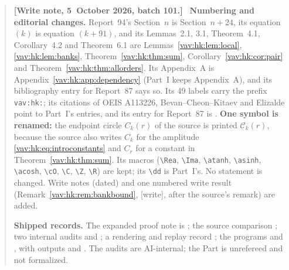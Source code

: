 \documentclass[11pt]{article}
\theoremstyle{remark}\newtheorem{remark}[theorem]{Remark}
\newcommand{\dd}{\,\mathrm d}
\newenvironment{writenoteb}{\begin{quote}\small\raggedright\textbf{[Write note, 5~October 2026, batch 101.]}\ }{\end{quote}}
\newcommand{\Rea}{\operatorname{Re}}
\newcommand{\Ima}{\operatorname{Im}}
\newcommand{\atanh}{\operatorname{artanh}}
\newcommand{\asinh}{\operatorname{arsinh}}
\newcommand{\acosh}{\operatorname{arcosh}}
\newcommand{\cO}{\mathcal O}
\newcommand{\C}{\mathbb C}
\newcommand{\Z}{\mathbb Z}
\newcommand{\R}{\mathbb R}
\begin{document}
\begin{writenoteb}
\textbf{Numbering and editorial changes.} Report~94's Section~$n$ is
Section~$n+24$, its equation $(k)$ is equation $(k+91)$, and its
Lemmas~2.1, 3.1, Theorem~4.1, Corollary~4.2 and Theorem~6.1 are
Lemmas~\ref{vav:hk:lem:local}, \ref{vav:hk:lem:banks},
Theorem~\ref{vav:hk:thm:sum}, Corollary~\ref{vav:hk:cor:pair} and
Theorem~\ref{vav:hk:thm:allorders}. Its Appendix~A is
Appendix~\ref{vav:hk:app:dependency} (Part~I keeps Appendix~A), and its
bibliography entry for Report~87 says so. Its 49 labels carry the prefix
\texttt{vav:hk:}; its citations of OEIS A113226, Bevan--Cheon--Kitaev and
Elizalde point to Part~I's entries, and its entry for Report~87 is
\cite{hkprior}. \textbf{One symbol is renamed:} the endpoint circle
$C_k(r)$ of the source is printed $\mathcal C_k(r)$, because the source
also writes $C_k$ for the amplitude \eqref{vav:hk:eq:introconstants} and
$C_r$ for a constant in Theorem~\ref{vav:hk:thm:sum}. Its macros
(\verb|\Rea|, \verb|\Ima|, \verb|\atanh|, \verb|\asinh|, \verb|\acosh|,
\verb|\cO|, \verb|\C|, \verb|\Z|, \verb|\R|) are kept; its \verb|\dd| is
Part~I's. No statement is changed. Write notes (dated) and one numbered
write result (Remark~\ref{vav:hk:rem:bankbound}, [write], after the
source's remark) are added.

\textbf{Shipped records.} The expanded proof note is
; the source comparison
; two internal audits
 and
; a rendering and
replay record ; the programs
 and
, with outputs
 and
. The audits are
AI-internal; the Part is unrefereed and not formalized.
\end{writenoteb}
\end{document}
